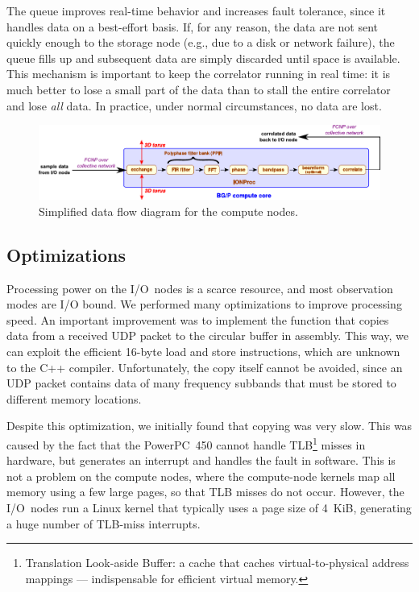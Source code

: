 \documentclass{sig-alternate}
\begin{document}
The queue improves real-time behavior and increases fault tolerance, since
it handles data on a best-effort basis.
If, for any reason, the data are not sent quickly enough to the storage node
(e.g., due to a disk or network failure), the queue fills up and subsequent
data are simply discarded until space is available.
This mechanism is important to keep the correlator running in real
time: it is much better to lose a small part of the data than to stall the
entire correlator and lose \emph{all\/} data.
In practice, under normal circumstances, no data are lost.


\begin{figure}[ht]
\begin{center}
\includegraphics[width=.8\textwidth]{CN-processing.pdf}
\end{center}
\caption{Simplified data flow diagram for the compute nodes.}
\label{fig:cn-processing}
\end{figure}

\subsection{Optimizations}

Processing power on the I/O~nodes is a scarce resource, and most observation
modes are I/O bound.
We performed many optimizations to improve processing speed.
An important improvement was to implement the function that copies data from a
received UDP packet to the circular buffer in assembly.
This way, we can exploit the efficient 16-byte load and
store instructions, which are unknown to the C++ compiler.
Unfortunately, the copy itself cannot be avoided, since an UDP packet contains
data of many frequency subbands that must be stored to different memory
locations.

Despite this optimization, we initially found that copying was very slow.
This was caused by the fact that the PowerPC~450 cannot handle
TLB\footnote{Translation Look-aside Buffer: a cache that caches
virtual-to-physical address mappings --- indispensable for efficient virtual
memory.} misses in hardware, but generates an interrupt and handles the fault
in software.
This is not a problem on the compute nodes, where the compute-node kernels 
map all memory using a few large pages, so that TLB misses do not occur.
However, the I/O~nodes run a Linux kernel that typically uses a page size of
4~KiB, generating a huge number of TLB-miss interrupts.
\end{document}
